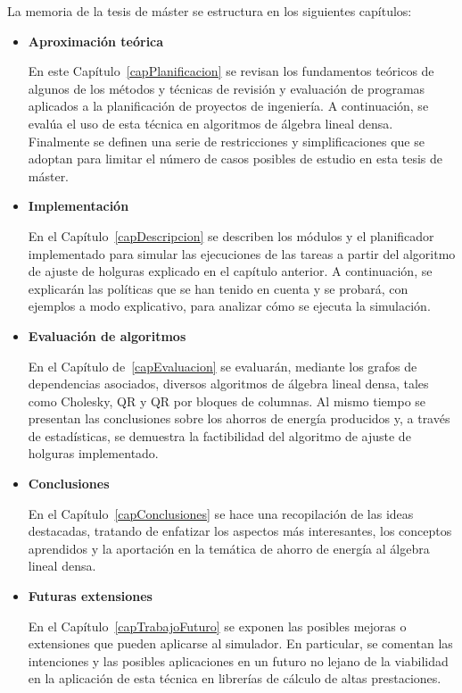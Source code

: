La memoria de la tesis de máster se estructura en los siguientes capítulos:

\begin{itemize}

\item \textbf{Aproximación teórica}

En este Capítulo~\ref{capPlanificacion} se revisan los fundamentos teóricos de 
algunos de los métodos y técnicas de revisión y evaluación 
de programas aplicados a la planificación de proyectos de 
ingeniería. A continuación, se evalúa el uso de esta técnica
en algoritmos de álgebra lineal densa. Finalmente se definen 
una serie de restricciones y simplificaciones que se adoptan  para limitar 
el número de casos posibles de estudio en esta tesis de máster.

\item \textbf{Implementación}

En el Capítulo~\ref{capDescripcion} se describen los módulos y el planificador implementado 
para simular las ejecuciones de las tareas a partir del algoritmo de
ajuste de holguras explicado en el capítulo anterior. A continuación,
se explicarán las políticas que se han tenido en cuenta
y se probará, con ejemplos a modo explicativo, para analizar cómo se ejecuta la simulación. 

\item \textbf{Evaluación de algoritmos}

En el Capítulo de~\ref{capEvaluacion} se evaluarán, mediante los
grafos de dependencias asociados, diversos algoritmos de álgebra lineal
densa, tales como Cholesky, QR y QR por bloques de columnas.
Al mismo tiempo se presentan las conclusiones sobre los ahorros
de energía producidos y, a través de estadísticas, se demuestra
la factibilidad del algoritmo de ajuste de holguras implementado.

\item \textbf{Conclusiones}

En el Capítulo~\ref{capConclusiones} se hace una recopilación de las
ideas destacadas, tratando de enfatizar los aspectos más interesantes, 
los conceptos aprendidos y la aportación en la temática de ahorro
de energía al álgebra lineal densa.

\item \textbf{Futuras extensiones}

En el Capítulo~\ref{capTrabajoFuturo} se exponen las posibles mejoras o
extensiones que pueden aplicarse al simulador. En particular, se
comentan las intenciones y las posibles aplicaciones en un futuro
no lejano de la viabilidad en la aplicación de esta técnica en
librerías de cálculo de altas prestaciones.

\end{itemize}
